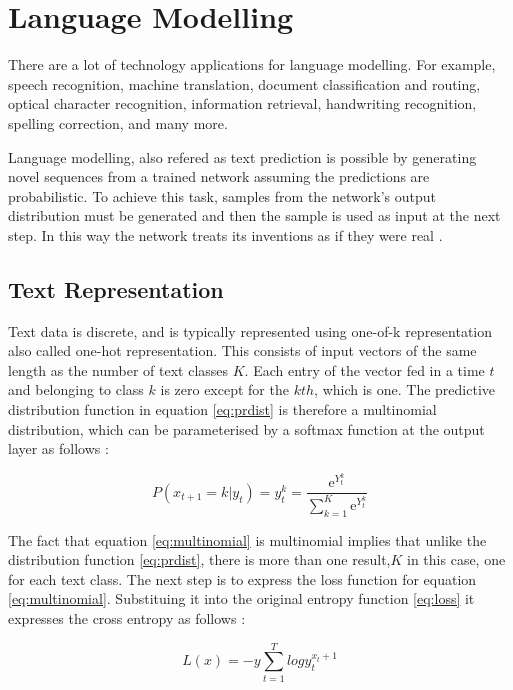 \section{Language Modelling}
There are a lot of technology applications for language modelling. For example, speech recognition, machine translation, document classification and routing, optical character recognition, information retrieval, handwriting recognition, spelling correction, and many more.

Language modelling, also refered as text prediction is possible by generating novel sequences from a trained network assuming the predictions are probabilistic. To achieve this task, samples from the network's output distribution must be generated and then the sample is used as input at the next step. In this way the network treats its inventions as if they were real \cite{graves2013generating}.

\subsection{Text Representation}
Text data is discrete, and is typically represented using one-of-k representation also called one-hot representation. This consists of input vectors of the same length as the number of text classes $K$. Each entry of the vector fed in a time $t$ and belonging to class $k$ is zero except for the $kth$, which is one. The predictive distribution function in equation \ref{eq:prdist} is therefore a multinomial distribution, which can be parameterised by a softmax function at the output layer as follows \cite{graves2013generating}:

\begin{equation} \label{eq:multinomial}
P(x_{t+1}=k|y_t)=y^k_t=\frac{\mathrm{e}^{Y^k_t}}{ \sum_{k=1}^{K} \mathrm{e}^{Y^k_t}}
\end{equation}

The fact that equation \ref{eq:multinomial} is multinomial implies that unlike the distribution function \ref{eq:prdist}, there is more than one result,$K$ in this case, one for each text class. The next step is to express the loss function for equation \ref{eq:multinomial}. Substituing it into the original entropy function \ref{eq:loss} it expresses the cross entropy as follows \cite{graves2013generating}:

\begin{equation} \label{eq:crossEntropy}
L(x)=-y \sum_{t=1}^{T} log y^{x_t+1}_t
\end{equation}


